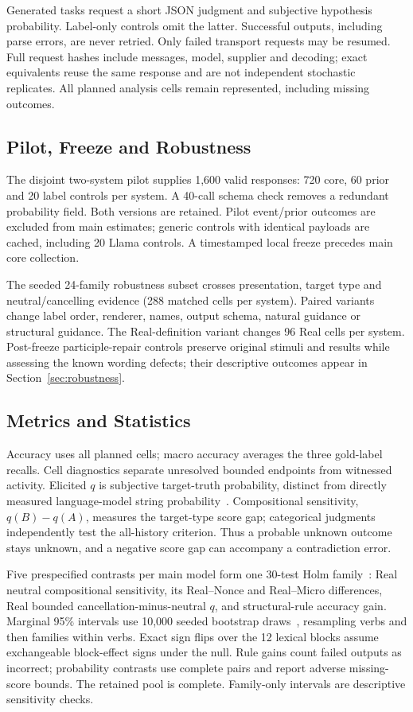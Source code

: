 \documentclass[sigconf,anonymous,review]{acmart}
\begin{document}
Generated tasks request a short JSON judgment and subjective hypothesis probability. Label-only controls omit the latter. Successful outputs, including parse errors, are never retried. Only failed transport requests may be resumed. Full request hashes include messages, model, supplier and decoding; exact equivalents reuse the same response and are not independent stochastic replicates. All planned analysis cells remain represented, including missing outcomes.

\subsection{Pilot, Freeze and Robustness}
The disjoint two-system pilot supplies 1,600 valid responses: 720 core, 60 prior and 20 label controls per system. A 40-call schema check removes a redundant probability field. Both versions are retained. Pilot event/prior outcomes are excluded from main estimates; generic controls with identical payloads are cached, including 20 Llama controls. A timestamped local freeze precedes main core collection.

The seeded 24-family robustness subset crosses presentation, target type and neutral/cancelling evidence (288 matched cells per system). Paired variants change label order, renderer, names, output schema, natural guidance or structural guidance. The Real-definition variant changes 96 Real cells per system. Post-freeze participle-repair controls preserve original stimuli and results while assessing the known wording defects; their descriptive outcomes appear in Section~\ref{sec:robustness}.

\subsection{Metrics and Statistics}
Accuracy uses all planned cells; macro accuracy averages the three gold-label recalls. Cell diagnostics separate unresolved bounded endpoints from witnessed activity. Elicited $q$ is subjective target-truth probability, distinct from directly measured language-model string probability~\cite{hu2023}. Compositional sensitivity, $q(B)-q(A)$, measures the target-type score gap; categorical judgments independently test the all-history criterion. Thus a probable unknown outcome stays unknown, and a negative score gap can accompany a contradiction error.

Five prespecified contrasts per main model form one 30-test Holm family~\cite{holm1979}: Real neutral compositional sensitivity, its Real--Nonce and Real--Micro differences, Real bounded cancellation-minus-neutral $q$, and structural-rule accuracy gain. Marginal 95\% intervals use 10,000 seeded bootstrap draws~\cite{efron1979}, resampling verbs and then families within verbs. Exact sign flips over the 12 lexical blocks assume exchangeable block-effect signs under the null. Rule gains count failed outputs as incorrect; probability contrasts use complete pairs and report adverse missing-score bounds. The retained pool is complete. Family-only intervals are descriptive sensitivity checks.
\end{document}

